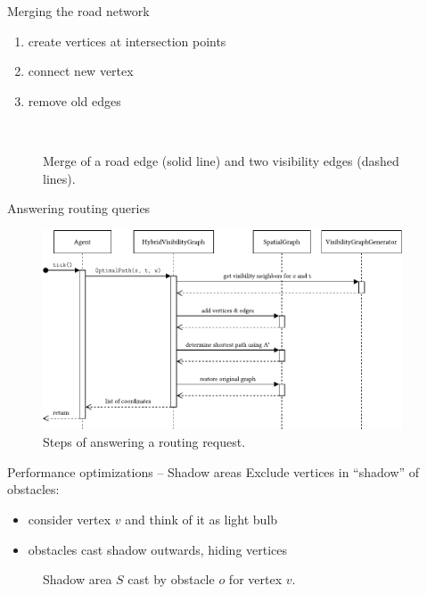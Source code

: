 \documentclass[xcolor={x11names}]{beamer}
\renewcommand{\n}{\hfill\\[0.5ex]}
\newenvironment{figcenter}
{%
	\parskip=0pt%
	\par%
	\nopagebreak%
	\centering%
}%
{%
	\par%
	\noindent%
	\ignorespacesafterend%
}
\begin{document}
		\begin{frame}{Merging the road network}
			\begin{enumerate}
				\item create vertices at intersection points
				\item connect new vertex
				\item remove old edges
			\end{enumerate}
			\n
			\begin{figure}
				\begin{figcenter}
					\scalebox{0.7}
					{
						
					}
					\hspace{0.75cm}
					\scalebox{0.7}
					{
						
					}
				\end{figcenter}
				\caption{Merge of a road edge (solid line) and two visibility edges (dashed lines).}
			\end{figure}
		\end{frame}
		
		\begin{frame}{Answering routing queries}
			\begin{figure}[t]
				\begin{figcenter}
					\includegraphics[width=0.95\textwidth]{images/components-sequence-routing-short.pdf}
				\end{figcenter}
				\caption{Steps of answering a routing request.}
			\end{figure}
		\end{frame}
		
		\begin{frame}{Performance optimizations -- Shadow areas}
			Exclude vertices in \enquote{shadow} of obstacles:\n
			\begin{itemize}
				\item consider vertex $v$ and think of it as light bulb
				\item obstacles cast shadow outwards, hiding vertices
			\end{itemize}
			\begin{figure}[b]
				\begin{figcenter}
					\scalebox{0.7}
					{
						
					}
				\end{figcenter}
				\caption{Shadow area $S$ cast by obstacle $o$ for vertex $v$.}
			\end{figure}
		\end{frame}
		
\end{document}
